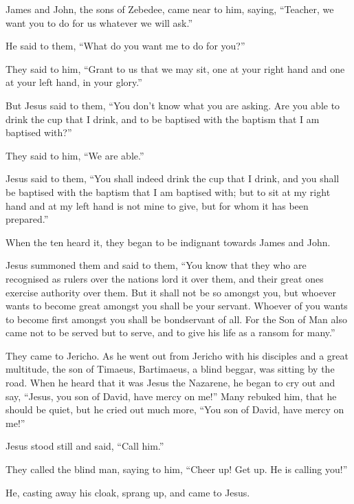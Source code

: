  James and John, the sons of Zebedee, came near to him,
saying, ``Teacher, we want you to do for us whatever we will ask.''

 He said to them, ``What do you want me to do for you?''

 They said to him, ``Grant to us that we may sit, one at
your right hand and one at your left hand, in your glory.''

 But Jesus said to them, ``You don't know what you are
asking. Are you able to drink the cup that I drink, and to be baptised
with the baptism that I am baptised with?''

 They said to him, ``We are able.''

Jesus said to them, ``You shall indeed drink the cup that I drink, and
you shall be baptised with the baptism that I am baptised with;
 but to sit at my right hand and at my left hand is not
mine to give, but for whom it has been prepared.''

 When the ten heard it, they began to be indignant
towards James and John.

 Jesus summoned them and said to them, ``You know that
they who are recognised as rulers over the nations lord it over them,
and their great ones exercise authority over them.  But
it shall not be so amongst you, but whoever wants to become great
amongst you shall be your servant.  Whoever of you wants
to become first amongst you shall be bondservant of all. 
For the Son of Man also came not to be served but to serve, and to give
his life as a ransom for many.''

 They came to Jericho. As he went out from Jericho with
his disciples and a great multitude, the son of Timaeus, Bartimaeus, a
blind beggar, was sitting by the road.  When he heard
that it was Jesus the Nazarene, he began to cry out and say, ``Jesus,
you son of David, have mercy on me!''  Many rebuked him,
that he should be quiet, but he cried out much more, ``You son of David,
have mercy on me!''

 Jesus stood still and said, ``Call him.''

They called the blind man, saying to him, ``Cheer up! Get up. He is
calling you!''

 He, casting away his cloak, sprang up, and came to
Jesus.

